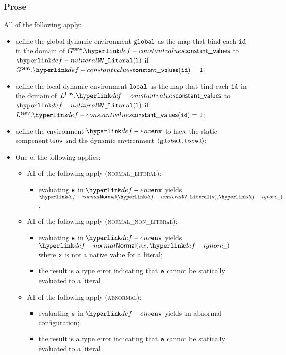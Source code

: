 \subsubsection{Prose}
All of the following apply:
\begin{itemize}
  \item define the global dynamic environment $\texttt{global}$ as the map that bind
        each $\texttt{id}$ in the domain of $G^\tenv.\constantvalues$ to $\nvliteral{\vl}$
        if $G^\tenv.\constantvalues(\id) = \vl$;
  \item define the local dynamic environment $\texttt{local}$ as the map that bind
        each $\texttt{id}$ in the domain of $L^\tenv.\constantvalues$ to $\nvliteral{\vl}$
        if $L^\tenv.\constantvalues(\id) = \vl$;
  \item define the environment $\env$ to have the static component $\textsf{tenv}$ and the dynamic
        environment $(\texttt{global}, \texttt{local})$;
  \item One of the following applies:
  \begin{itemize}
    \item All of the following apply (\textsc{normal\_literal}):
    \begin{itemize}
      \item evaluating $\texttt{e}$ in $\env$ yields $\Normal(\nvliteral{\vv}, \Ignore)$.
    \end{itemize}

    \item All of the following apply (\textsc{normal\_non\_literal}):
    \begin{itemize}
      \item evaluating $\texttt{e}$ in $\env$ yields $\Normal(vx, \Ignore)$
            where $\texttt{x}$ is not a native value for a literal;
      \item the result is a type error indicating that $\texttt{e}$ cannot be statically evaluated to a literal.
    \end{itemize}

    \item All of the following apply (\textsc{abnormal}):
    \begin{itemize}
      \item evaluating $\texttt{e}$ in $\env$ yields an abnormal configuration;
      \item the result is a type error indicating that $\texttt{e}$ cannot be statically evaluated to a literal.
    \end{itemize}
  \end{itemize}
\end{itemize}

